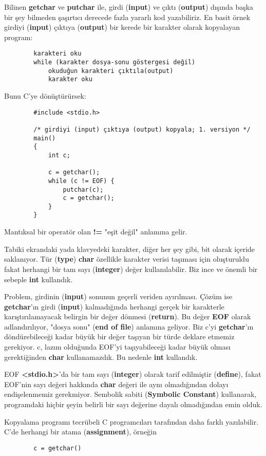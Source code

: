 \documentclass[a4paper,12pt,oneside]{book}
\begin{document}
Bilinen \textbf{getchar} ve \textbf{putchar} ile, girdi (\textbf{input}) ve çıktı (\textbf{output}) dışında başka bir şey bilmeden şaşırtıcı derecede fazla yararlı kod yazabiliriz. En basit örnek girdiyi (\textbf{input}) çıktıya (\textbf{output}) bir kerede bir karakter olarak kopyalayan program:
\begin{lstlisting}
		karakteri oku
		while (karakter dosya-sonu göstergesi değil)
			okuduğun karakteri çıktıla(output)
			karakter oku
\end{lstlisting}
Bunu C'ye dönüştürürsek:
\begin{lstlisting}
		#include <stdio.h>

		/* girdiyi (input) çıktıya (output) kopyala; 1. versiyon */
		main()
		{
			int c;

			c = getchar();
			while (c != EOF) {
				putchar(c);
				c = getchar();
			}
		}
\end{lstlisting}
Mantıksal bir operatör olan \textbf{ !=} "eşit değil" anlamına gelir.
\par Tabiki ekrandaki yada klavyedeki karakter, diğer her şey gibi, bit olarak içeride saklanıyor. Tür (\textbf{type}) \textbf{char} özellikle karakter verisi taşıması için oluşturuldu fakat herhangi bir tam sayı (\textbf{integer}) değer kullanılabilir. Biz ince ve önemli bir sebeple \textbf{int} kullandık.
\par Problem, girdinin (\textbf{input}) sonunun geçerli veriden ayırılması. Çözüm ise \textbf{getchar}'ın girdi (\textbf{input}) kalmadığında herhangi gerçek bir karakterle karıştırılamayacak belirgin bir değer dönmesi (\textbf{return}). Bu değer \textbf{EOF} olarak adlandırılıyor, "dosya sonu" (\textbf{end of file}) anlamına geliyor. Biz c'yi \textbf{getchar}'ın döndürebileceği kadar büyük bir değer taşıyan bir türde deklare etmemiz gerekiyor. c, lazım olduğunda EOF'yi taşıyabileceği kadar büyük olması gerektiğinden \textbf{char} kullanamazdık. Bu nedenle \textbf{int} kullandık.
\par EOF \textbf{<stdio.h>}'da bir tam sayı (\textbf{integer}) olarak tarif edilmiştir (\textbf{define}), fakat EOF'nin sayı değeri hakkında \textbf{char} değeri ile aynı olmadığından dolayı endişelenmemiz gerekmiyor. Sembolik sabiti (\textbf{Symbolic Constant}) kullanarak, programdaki hiçbir şeyin belirli bir sayı değerine dayalı olmadığından emin olduk.
\par Kopyalama programı tecrübeli C programcıları tarafından daha farklı yazılabilir. C'de herhangi bir atama (\textbf{assignment}), örneğin
\begin{lstlisting}
		c = getchar()
\end{lstlisting}
\end{document}
